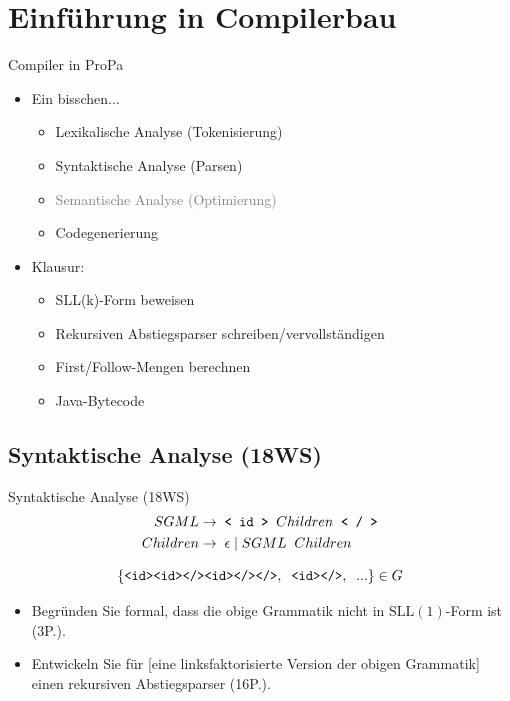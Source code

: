 \documentclass{beamer}
\begin{document}
\section{Einführung in Compilerbau}


\begin{frame}{Compiler in ProPa}
	\begin{itemize}
		\item Ein bisschen...
		\begin{itemize}
			\item Lexikalische Analyse (Tokenisierung)
			\item Syntaktische Analyse (Parsen)
			\item \textcolor{gray}{Semantische Analyse (Optimierung)}
			\item Codegenerierung
		\end{itemize}
		\pause
		\item Klausur:
		\begin{itemize}
			\item SLL(k)-Form beweisen
			\item Rekursiven Abstiegsparser schreiben/vervollständigen
			\item First/Follow-Mengen berechnen
			\item Java-Bytecode
		\end{itemize}
	\end{itemize}
\end{frame}

\subsection{Syntaktische Analyse (18WS)}

\begin{frame}{Syntaktische Analyse (18WS)}
	\begin{align*}
		SGML \to & \;\; \textrm{\texttt{< id >}} \;\; Children \;\; \textrm{\texttt{< / >}}\\
		Children \to & \;\; \epsilon \mid SGML \;\; Children
	\end{align*}

	\begin{equation*}
		\{\textrm{\texttt{<id><id></><id></></>}},\;\;\textrm{\texttt{<id></>}},\;\;...\} \in G
	\end{equation*}

	\pause
	\begin{itemize}
		\item Begründen Sie formal, dass die obige Grammatik nicht in $\textrm{SLL}(1)$-Form ist (3P.).
		\pause
		\item Entwickeln Sie für [eine linksfaktorisierte Version der obigen Grammatik] einen rekursiven Abstiegsparser (16P.).
	\end{itemize}
\end{frame}
\end{document}
